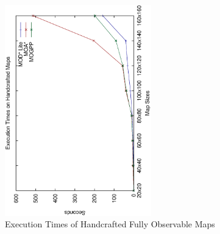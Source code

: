 \documentclass[10pt,journal]{IEEEtran}
\begin{document}
\begin{figure}
\centering
\includegraphics[width=2.5in, angle=270]{experimental/handcrafted_normal}
\caption{Execution Times of Handcrafted Fully Observable Maps}
\label{fig:hand_fully}
\end{figure}
\end{document}
